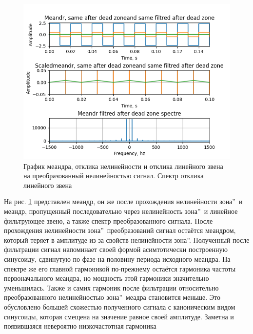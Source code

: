 \begin{figure}[H]
	\centering
	\includegraphics[width=0.95\linewidth]{body/images/meandr-after-filtred-dead-zone-and-its-spectre.png}
	\caption{График меандра, отклика нелинейности и отклика линейного звена на преобразованный
	нелинейностью сигнал. Спектр отклика линейного звена}
	\label{fig:26}
\end{figure}

На рис. \ref{fig:26} представлен меандр, он же после прохождения
нелинейности  зона\textquotedblright\ и меандр,
пропущенный последовательно через нелинейность
 зона\textquotedblright\ и 
линейное фильтрующее звено, а также спектр преобразованного сигнала.
После прохождения нелинейности  зона\textquotedblright\
преобразований сигнал остаётся меандром, который теряет в амплитуде из-за 
свойств нелинейности \textquotedblleftМёртвая зона\textquotedblright.
Полученный после фильтрации сигнал напоминает своей формой асимтотически
построенную синусоиду, сдвинутую по фазе на половину периода исходного меандра.
На спектре же его главной гармоникой по-прежнему остаётся гармоника частоты
первоначального меандра, но мощность этой гармоники значительно уменьшилась.
Также и самих гармоник после фильтрации относительно преобразованного нелинейностью
\textquotedblleftМёртвая зона\textquotedblright\ меадра становится
меньше. Это обусловлено большей схожестью полученного сигнала с каноническим
видом синусоиды, которая смещена на значение равное своей амплитуде.
Заметна и появившаяся невероятно низкочастотная гармоника

